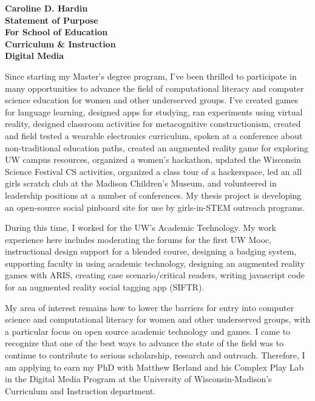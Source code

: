 \documentclass[12pt]{letter}
\begin{document}
\begin{letter}

\noindent 
\large\textbf{Caroline D. Hardin\\
Statement of Purpose\\
For School of Education\\
Curriculum \& Instruction\\
Digital Media
}
\vfill


\signature{Caroline D. Hardin} %

Since starting my Master's degree program, I've been thrilled to participate in many opportunities to advance the field of computational literacy and computer science education for women and other underserved groups. I’ve created games for language learning, designed apps for studying, ran experiments using virtual reality, designed classroom activities for metacognitive constructionism, created and field tested a wearable electronics curriculum, spoken at a conference about non-traditional education paths, created an augmented reality game for exploring UW campus resources, organized a women’s hackathon, updated the Wisconsin Science Festival CS activities, organized a class tour of a hackerspace, led an all girls scratch club at the Madison Children’s Museum, and volunteered in leadership positions at a number of conferences. My thesis project is developing an open-source social pinboard site for use by girls-in-STEM outreach programs.

During this time, I worked for the UW’s Academic Technology. My work experience here includes moderating the forums for the first UW Mooc, instructional design support for a blended course, designing a badging system, supporting faculty in using academic technology, designing an augmented reality games with ARIS, creating case scenario/critical readers, writing javascript code for an augmented reality social tagging app (SIFTR).

My area of interest remains how to lower the barriers for entry into computer science and computational literacy for women and other underserved groups, with a particular focus on open source academic technology and games. I came to recognize that one of the best ways to advance the state of the field was to continue to contribute to serious scholarship, research and outreach. Therefore, I am applying to earn my PhD with Matthew Berland and his Complex Play Lab in the Digital Media Program at the University of Wisconsin-Madison’s Curriculum and Instruction department. 


\end{letter}
\end{document}
